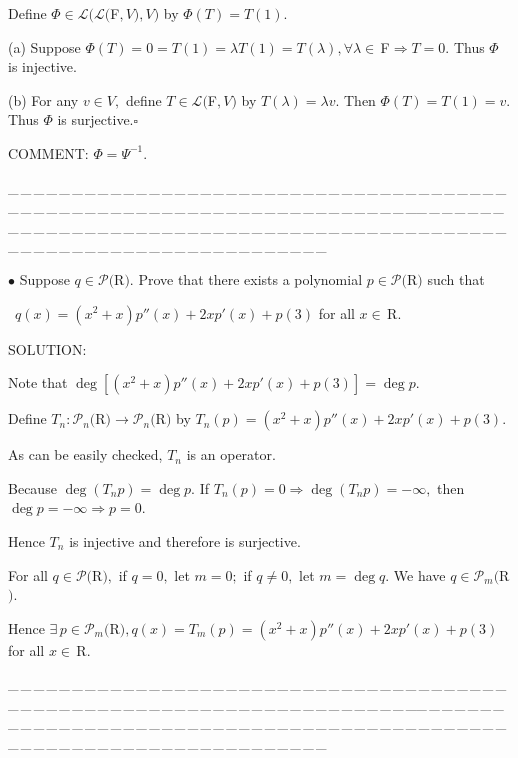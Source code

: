 \documentclass[a4paper, 11pt, UTF8]{article}
\def\Lm{\mathcal{L}}
\def\Po{\mathcal{P}}
\def\Fbfc{$\,{\timesbf F}$}
\def\Rbfc{$\,{\timesbf R}$}
\begin{document}
\begin{large}
Define $\Phi\in\Lm(\Lm(${\timesbf F}$,V), V)$ by $\Phi(T)=T(1).$\par\quad
(a) Suppose $\Phi(T)=0=T(1)=\lambda T(1)=T(\lambda),\forall\lambda\in\Fbfc\Rightarrow T=0.$ Thus $\Phi$ is injective.\par\quad
(b) For any $v\in V,$ define $T\in\Lm(${\timesbf F}$,V)$ by $T(\lambda)=\lambda v.$ Then $\Phi(T)=T(1)=v.$ Thus $\Phi$ is surjective.\quad$\square$\par\quad
C{\small OMMENT:} $\Phi=\Psi^{-1}.$\par
{\tiny \_\,\_\,\_\,\_\,\_\,\_\,\_\,\_\,\_\,\_\,\_\,\_\,\_\,\_\,\_\,\_\,\_\,\_\,\_\,\_\,\_\,\_\,\_\,\_\,\_\,\_\,\_\,\_\,\_\,\_\,\_\,\_\,\_\,\_\,\_\,\_\,\_\,\_\,\_\,\_\,\_\,\_\,\_\,\_\,\_\,\_\,\_\,\_\,\_\,\_\,\_\,\_\,\_\,\_\,\_\,\_\,\_\,\_\,\_\,\_\,\_\,\_\,\_\,\_\,\_\,\_\,\_\,\_\,\_\,\_\,\_\_\,\_\,\_\,\_\,\_\,\_\,\_\,\_\,\_\,\_\,\_\,\_\,\_\,\_\,\_\,\_\,\_\,\_\,\_\,\_\,\_\,\_\,\_\,\_\,\_\,\_\,\_\,\_\,\_\,\_\,\_\,\_\,\_\,\_\,\_\,\_\,\_\,\_\,\_\,\_\,\_\,\_\,\_\,\_\,\_\,\_\,\_\,\_\,\_\,\_\,\_\,\_\,\_\,\_\,\_\,\_\,\_\,\_\,\_\,\_\,\_\,\_\,\_\,\_\,\_\,\_\,\_\,\_\,\_\,\_\,\_\par}

{\small $\bullet$} {\timessl\Large 
Suppose $q\in\Po(${\timesbf R}$)$. Prove that there exists a polynomial $p\in\Po(${\timesbf R}$)$ such that}\par\,\,\,{\timessl\Large $q(x) = (x^2 + x)p''(x) + 2xp'(x) + p(3)$ for all $x\in\Rbfc.$}\par
{\timesbf S\footnotesize{OLUTION:}}\par\quad
Note that $\deg[(x^2 + x)p''(x) + 2xp'(x) + p(3)]=\deg p.$\par\quad
Define $T_n:\Po_n(${\timesbf R}$)\rightarrow\Po_n(${\timesbf R}$)$ by $T_n(p)=(x^2 + x)p''(x) + 2xp'(x) + p(3).$\par\quad
As can be easily checked, $T_n$ is an operator.\par\quad
Because $\deg(T_n p)=\deg p.$ If $T_n(p)=0\Rightarrow\deg(T_n p)=-\infty,$ then $\deg p=-\infty\Rightarrow p=0.$\par\quad
Hence $T_n$ is injective and therefore is surjective.\par\quad
For all $q\in\Po(${\timesbf R}$),$ if $q=0,$ let $m=0;$ if $q\neq 0,$ let $m=\deg q.$ We have $q\in\Po_m(${\timesbf R}$).$\par\quad
Hence $\exists\,p\in\Po_m(${\timesbf R}$), q(x)=T_m(p)=(x^2 + x)p''(x) + 2xp'(x) + p(3)$ for all $x\in\Rbfc.$
\par
{\tiny \_\,\_\,\_\,\_\,\_\,\_\,\_\,\_\,\_\,\_\,\_\,\_\,\_\,\_\,\_\,\_\,\_\,\_\,\_\,\_\,\_\,\_\,\_\,\_\,\_\,\_\,\_\,\_\,\_\,\_\,\_\,\_\,\_\,\_\,\_\,\_\,\_\,\_\,\_\,\_\,\_\,\_\,\_\,\_\,\_\,\_\,\_\,\_\,\_\,\_\,\_\,\_\,\_\,\_\,\_\,\_\,\_\,\_\,\_\,\_\,\_\,\_\,\_\,\_\,\_\,\_\,\_\,\_\,\_\,\_\,\_\_\,\_\,\_\,\_\,\_\,\_\,\_\,\_\,\_\,\_\,\_\,\_\,\_\,\_\,\_\,\_\,\_\,\_\,\_\,\_\,\_\,\_\,\_\,\_\,\_\,\_\,\_\,\_\,\_\,\_\,\_\,\_\,\_\,\_\,\_\,\_\,\_\,\_\,\_\,\_\,\_\,\_\,\_\,\_\,\_\,\_\,\_\,\_\,\_\,\_\,\_\,\_\,\_\,\_\,\_\,\_\,\_\,\_\,\_\,\_\,\_\,\_\,\_\,\_\,\_\,\_\,\_\,\_\,\_\,\_\,\_\par}


\end{large}
\end{document}
